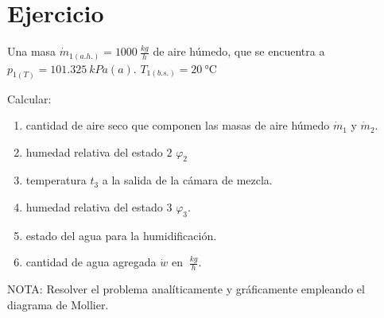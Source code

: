 \section{Ejercicio}\label{ej:Chap12Ejercicio11}
Una masa $\dot{m}_{1(a.h.)}=\SI{1000}{\frac{kg}{h}}$ de aire húmedo, que se encuentra a $p_{1(T)}=\SI{101.325}{kPa(a)}$. $T_{1(b.s.)}=\SI{20}{\celsius}$


Calcular:
\begin{enumerate}
    \item cantidad de aire seco que componen las masas de aire húmedo $\dot{m}_1$ y $\dot{m}_2$.
    \item humedad relativa del estado $2$ $\varphi_2$
    \item temperatura $t_3$ a la salida de la cámara de mezcla.
    \item humedad relativa del estado $3$ $\varphi_3$.
    \item estado del agua para la humidificación.
    \item cantidad de agua agregada $\dot{w}$ en $\SI{}{\frac{kg}{h}}$.
\end{enumerate}

NOTA: Resolver el problema analíticamente y gráficamente empleando el diagrama de Mollier.